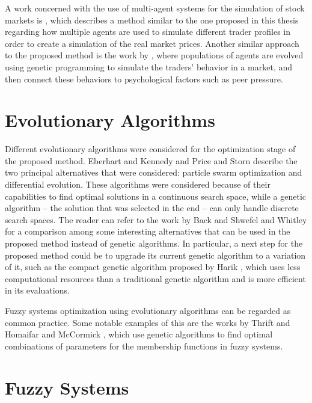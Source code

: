 A work concerned with the use of multi-agent systems for the simulation of stock
markets is \cite{Kendall2003}, which describes a method similar to the one
proposed in this thesis regarding how multiple agents are used to simulate
different trader profiles in order to create a simulation of the real market
prices. Another similar approach to the proposed method is the work by
\cite{Chen2001}, where populations of agents are evolved using genetic
programming to simulate the traders' behavior in a market, and then connect
these behaviors to psychological factors such as peer pressure.

\section{Evolutionary Algorithms}
\label{section:evolutionary-algorithms}

Different evolutionary algorithms were considered for the optimization stage of
the proposed method. Eberhart and Kennedy \cite{Eberhart2002} and Price and
Storn \cite{Price1997} describe the two principal alternatives that were
considered: particle swarm optimization and differential evolution. These
algorithms were considered because of their capabilities to find optimal
solutions in a continuous search space, while a genetic algorithm -- the
solution that was selected in the end -- can only handle discrete search
spaces. The reader can refer to the work by Back and Shwefel \cite{Back2008} and
Whitley \cite{Whitley1994} for a comparison among some interesting alternatives
that can be used in the proposed method instead of genetic algorithms. In
particular, a next step for the proposed method could be to upgrade its current
genetic algorithm to a variation of it, such as the compact genetic algorithm
proposed by Harik \cite{Harik1999}, which uses less computational resources than
a traditional genetic algorithm and is more efficient in its evaluations.

Fuzzy systems optimization using evolutionary algorithms can be regarded as
common practice. Some notable examples of this are the works by Thrift
\cite{Thrift1991} and Homaifar and McCormick \cite{Homaifar19995}, which use
genetic algorithms to find optimal combinations of parameters for the membership
functions in fuzzy systems.

\section{Fuzzy Systems}
\label{section:fuzzy-systems}

